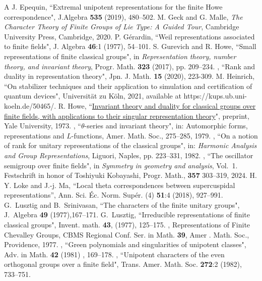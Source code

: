 \documentclass[12pt]{amsart}
\numberwithin{equation}{subsection}
\begin{document}
\begin{thebibliography}{A}
 J. Epequin, ``Extremal unipotent representations for the finite Howe correspondence", J.Algebra \textbf{535} (2019), 480--502.
 M. Geck and G. Malle, \textit{The Character Theory of Finite Groups of Lie Type: A Guided Tour}, Cambridge University Press, Cambridge, 2020.
 P. G\'erardin, ``Weil representations associated to finite fields", J. Algebra \textbf{46}:1 (1977), 54--101.
 S. Gurevich and R. Howe, ``Small representations of finite classical groups", in \textit{Representation theory, number theory, and invariant theory}, Progr. Math. \textbf{323} (2017), pp. 209--234.
 \bysame, ``Rank and duality in representation theory", Jpn. J. Math. \textbf{15} (2020), 223-309.
 M. Heinrich, ``On stabilizer techniques and their application to simulation and certification of quantum devices", Universität zu Köln, 2021, available at https://kups.ub.uni-koeln.de/50465/.
 R. Howe, ``\href{https://bpb-us-w2.wpmucdn.com/blog.nus.edu.sg/dist/3/12136/files/2021/02/Howe-Invariant-Theory-and-Duality-finite-fields.pdf}{Invariant theory and duality for classical groups over finite fields, with applications to their singular representation theory}", preprint, Yale University, 1973.
 \bysame, ``$\theta$-series and invariant theory", in: Automorphic forms, representations and $L$-functions, Amer. Math. Soc., 275--285, 1979.
 \bysame, ``On a notion of rank for unitary representations of the classical groups", in: \textit{Harmonic Analysis and Group Representations}, Liguori, Naples, pp. 223--331, 1982.
 \bysame, ``The oscillator semigroup over finite fields", in \textit{Symmetry in geometry and analysis}, Vol.~1. Festschrift in honor of Toshiyuki Kobayashi, 
Progr. Math., \textbf{357} 303--319, 2024.
 H. Y. Loke and J.-j. Ma, ``Local theta correspondences between supercuspidal representations”, Ann. Sci. \'Ec. Norm. Sup\'er. (4) \textbf{51}:4 (2018),  927--991.
 G.~Lusztig and B.~Srinivasan, ``The characters of the finite unitary groups", J.~Algebra \textbf{49} (1977),167--171.
 G.~Lusztig, ``Irreducible representations of finite classical groups", Invent. math. \textbf{43}, (1977), 125--175.
 \bysame, Representations of Finite Chevalley Groups, CBMS Regional Conf. Ser. in Math. \textbf{39}, Amer . Math. Soc., Providence, 1977.
 \bysame, ``Green polynomials and singularities of unipotent classes", Adv. in Math. \textbf{42} (1981) , 169--178. 
   \bysame, ``Unipotent characters of the even orthogonal groups over a finite field", Trans. Amer. Math. Soc. \textbf{272}:2 (1982), 733--751.

\end{thebibliography}
\end{document}
